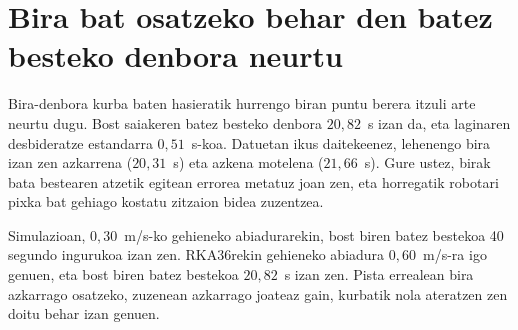 \section[Bira bat osatzeko behar den batez besteko denbora neurtu][Bira osatzeko batez besteko denbora]{Bira bat osatzeko behar den batez besteko denbora neurtu}\label{sec:er-denbora}

Bira-denbora kurba baten hasieratik hurrengo biran puntu berera itzuli arte neurtu dugu. Bost saiakeren batez besteko denbora $20{,}82$~s izan da, eta laginaren desbideratze estandarra $0{,}51$~s-koa. Datuetan ikus daitekeenez, lehenengo bira izan zen azkarrena ($20{,}31$~s) eta azkena motelena ($21{,}66$~s). Gure ustez, birak bata bestearen atzetik egitean errorea metatuz joan zen, eta horregatik robotari pixka bat gehiago kostatu zitzaion bidea zuzentzea.

Simulazioan, $0{,}30$~m/s-ko gehieneko abiadurarekin, bost biren batez bestekoa 40 segundo ingurukoa izan zen. RKA36rekin gehieneko abiadura $0{,}60$~m/s-ra igo genuen, eta bost biren batez bestekoa $20{,}82$~s izan zen. Pista errealean bira azkarrago osatzeko, zuzenean azkarrago joateaz gain, kurbatik nola ateratzen zen doitu behar izan genuen.
